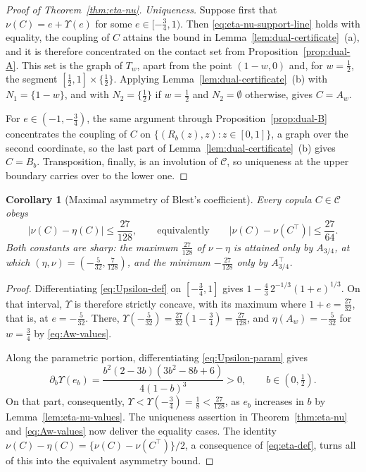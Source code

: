 \documentclass[11pt,a4paper]{article}
\newtheorem{corollary}[theorem]{Corollary}
\theoremstyle{remark}
\newcommand{\1}{\mathbf{1}}
\newcommand{\CC}{\mathcal{C}}
\begin{document}
\begin{proof}[Proof of Theorem~\ref{thm:eta-nu}]
\smallskip\noindent\emph{Uniqueness.}\quad
Suppose first that $\nu(C)=e+\Upsilon(e)$ for some $e\in[-\frac34,1)$.
Then \eqref{eq:eta-nu-support-line} holds with equality, the coupling of $C$ attains the bound in Lemma~\ref{lem:dual-certificate}~(a), and it is therefore concentrated on the contact set from Proposition~\ref{prop:dual-A}.
This set is the graph of $T_w$, apart from the point $(1-w,0)$ and, for $w=\frac12$, the segment $[\frac12,1]\times\{\frac12\}$.
Applying Lemma~\ref{lem:dual-certificate}~(b) with $N_1=\{1-w\}$, and with $N_2=\{\frac12\}$ if $w=\frac12$ and $N_2=\emptyset$ otherwise, gives $C=A_w$.

For $e\in(-1,-\frac34)$, the same argument through Proposition~\ref{prop:dual-B} concentrates the coupling of $C$ on $\{(R_b(z),z):z\in[0,1]\}$, a graph over the second coordinate, so the last part of Lemma~\ref{lem:dual-certificate}~(b) gives $C=B_b$.
Transposition, finally, is an involution of $\CC$, so uniqueness at the upper boundary carries over to the lower one.
\end{proof}

\begin{corollary}[Maximal asymmetry of Blest's coefficient]
\label{cor:asymmetry}
Every copula $C\in\CC$ obeys
\[
  |\nu(C)-\eta(C)|\le\frac{27}{128},
  \qquad\text{equivalently}\qquad
  \bigl|\nu(C)-\nu(C^\top)\bigr|\le\frac{27}{64}.
\]
Both constants are sharp: the maximum $\frac{27}{128}$ of $\nu-\eta$ is attained only by $A_{3/4}$, at which $(\eta,\nu)=(-\frac{5}{32},\frac{7}{128})$, and the minimum $-\frac{27}{128}$ only by $A_{3/4}^\top$.
\end{corollary}

\begin{proof}
Differentiating \eqref{eq:Upsilon-def} on $[-\frac34,1]$ gives $1-\frac43\,2^{-1/3}(1+e)^{1/3}$.
On that interval, $\Upsilon$ is therefore strictly concave, with its maximum where $1+e=\frac{27}{32}$, that is, at $e=-\frac{5}{32}$.
There, $\Upsilon(-\frac{5}{32})=\frac{27}{32}(1-\frac34)=\frac{27}{128}$, and $\eta(A_w)=-\frac{5}{32}$ for $w=\frac34$ by \eqref{eq:Aw-values}.

Along the parametric portion, differentiating \eqref{eq:Upsilon-param} gives
\[
  \partial_b\Upsilon(e_b)
  =\frac{b^2(2-3b)(3b^2-8b+6)}{4(1-b)^3}>0,
  \qquad b\in(0,\tfrac12).
\]
On that part, consequently, $\Upsilon<\Upsilon(-\frac34)=\frac18<\frac{27}{128}$, as $e_b$ increases in $b$ by Lemma~\ref{lem:eta-nu-values}.
The uniqueness assertion in Theorem~\ref{thm:eta-nu} and \eqref{eq:Aw-values} now deliver the equality cases.
The identity $\nu(C)-\eta(C)=\{\nu(C)-\nu(C^\top)\}/2$, a consequence of \eqref{eq:eta-def}, turns all of this into the equivalent asymmetry bound.
\end{proof}
\end{document}
